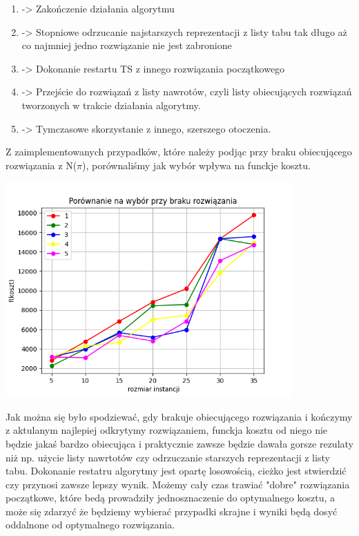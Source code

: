 \documentclass{article}
\begin{document}
    \begin{enumerate}
        \item -> Zakończenie działania algorytmu
        \item -> Stopniowe odrzucanie najstarszych reprezentacji z 
                 listy tabu tak długo aż co najmniej jedno rozwiązanie 
                 nie jest zabronione
        \item -> Dokonanie restartu TS z innego rozwiązania początkowego
        \item -> Przejście do rozwiązań z listy nawrotów, czyli listy 
                 obiecujących rozwiązań tworzonych w trakcie działania algorytmy.
        \item -> Tymczasowe skorzystanie z innego, szerszego otoczenia.
    \end{enumerate}
 
    Z zaimplementowanych przypadków, które należy podjąc przy braku obiecującego
    rozwiązania z N($\pi$), porównaliśmy jak wybór wpływa na funckje kosztu.

    \includegraphics[width=11cm]{./spr2img/Figure_9.png}

    Jak można się było spodziewać, gdy brakuje obiecującego rozwiązania 
    i kończymy z aktulanym najlepiej odkrytymy rozwiązaniem, funckja kosztu
    od niego nie będzie jakaś bardzo obiecująca i praktycznie zawsze będzie
    dawała gorsze rezulaty niż np. użycie listy nawrtotów czy odrzuczanie
    starszych reprezentacji z listy tabu. Dokonanie restatru algorytmy jest
    opartę losowością, cieżko jest stwierdzić czy przynosi zawsze lepszy wynik.
    Możemy cały czas trawiać "dobre" rozwiązania początkowe, które bedą prowadziły
    jednosznaczenie do optymalnego kosztu, a może się zdarzyć że będziemy 
    wybierać przypadki skrajne i wyniki będą dosyć oddalnone od optymalnego 
    rozwiązania.
\end{document}
